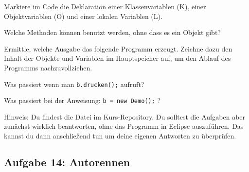 \begin{compactenum}[a)]
\item Markiere im Code die Deklaration einer Klassenvariablen (K), einer
Objektvariablen (O) und einer lokalen Variablen (L).
\item Welche Methoden können benutzt werden, ohne dass es ein Objekt gibt?
\item Ermittle, welche Ausgabe das folgende Programm erzeugt. Zeichne dazu den
Inhalt der Objekte und Variablen im Hauptspeicher auf, um den Ablauf des
Programms nachzuvollziehen.
\item Was passiert wenn man \lstinline|b.drucken();| aufruft?
\item Was passiert bei der Anweisung: \lstinline|b = new Demo();| ?
\end{compactenum}

Hinweis: Du findest die Datei  im Kurs-Repository. Du solltest
die Aufgaben aber zunächst wirklich beantworten, ohne das Programm in Eclipse
auszuführen. Das kannst du dann anschließend tun um deine eigenen Antworten zu
überprüfen.


\subsection{Aufgabe 14: Autorennen}

